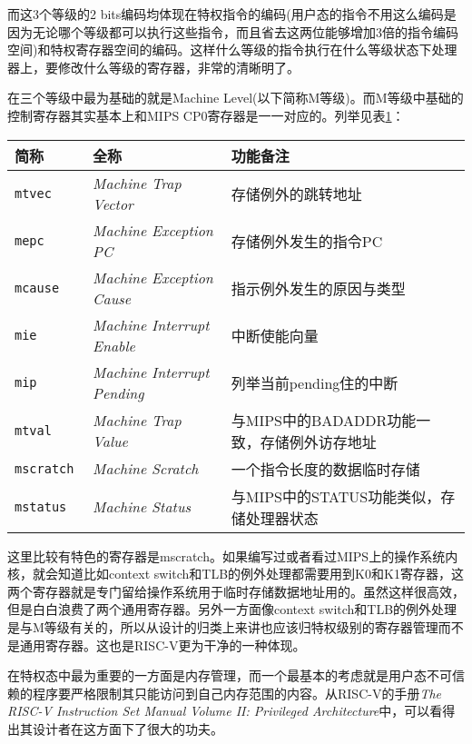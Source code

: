 \begin{itemize}
	而这3个等级的2 bits编码均体现在特权指令的编码(用户态的指令不用这么编码是因为无论哪个等级都可以执行这些指令，而且省去这两位能够增加3倍的指令编码空间)和特权寄存器空间的编码。这样什么等级的指令执行在什么等级状态下处理器上，要修改什么等级的寄存器，非常的清晰明了。
	
	在三个等级中最为基础的就是Machine Level(以下简称M等级)。而M等级中基础的控制寄存器其实基本上和MIPS CP0寄存器是一一对应的。列举见表\ref{tab:sampleofCSR}：
	\begin{table}[!htbp]
		\label{tab:sampleofCSR}
		\centering
		\footnotesize%
		\setlength{\tabcolsep}{4pt}%
		\renewcommand{\arraystretch}{1.2}%
		\begin{tabular}{lll}
			\hline
			简称 & 全称 & 功能备注 \\%
			\hline
			\tt mtvec    & \textit{Machine Trap Vector}       & 存储例外的跳转地址 \\
			\tt mepc     & \textit{Machine Exception PC}      & 存储例外发生的指令PC \\
			\tt mcause   & \textit{Machine Exception Cause}   & 指示例外发生的原因与类型 \\
			\tt mie      & \textit{Machine Interrupt Enable}  & 中断使能向量 \\
			\tt mip      & \textit{Machine Interrupt Pending} & 列举当前pending住的中断 \\
			\tt mtval    & \textit{Machine Trap Value} & 与MIPS中的BADADDR功能一致，存储例外访存地址 \\
			\tt mscratch & \textit{Machine Scratch}    & 一个指令长度的数据临时存储 \\
			\tt mstatus  & \textit{Machine Status}     & 与MIPS中的STATUS功能类似，存储处理器状态 \\
			\hline
		\end{tabular}
	\end{table}
	
	这里比较有特色的寄存器是mscratch。如果编写过或者看过MIPS上的操作系统内核，就会知道比如context switch和TLB的例外处理都需要用到K0和K1寄存器，这两个寄存器就是专门留给操作系统用于临时存储数据地址用的。虽然这样很高效，但是白白浪费了两个通用寄存器。另外一方面像context switch和TLB的例外处理是与M等级有关的，所以从设计的归类上来讲也应该归特权级别的寄存器管理而不是通用寄存器。这也是RISC-V更为干净的一种体现。
	
	在特权态中最为重要的一方面是内存管理，而一个最基本的考虑就是用户态不可信赖的程序要严格限制其只能访问到自己内存范围的内容。从RISC-V的手册\textit{The RISC-V Instruction Set Manual Volume II: Privileged Architecture}中，可以看得出其设计者在这方面下了很大的功夫。
	

\end{itemize}
